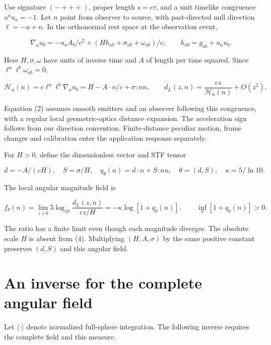 \documentclass[aps,prd,reprint,onecolumn,11pt,nofootinbib,notitlepage]{revtex4-2}
\begin{document}
Use signature \((-+++)\), proper length \(s=c\tau\), and a unit timelike congruence \(u^au_a=-1\). Let \(n\) point from observer to source, with past-directed null direction \(\ell=-u+n\). In the orthonormal rest space at the observation event,

\begin{equation}
 \nabla_a u_b=-u_a A_b/c^2+(Hh_{ab}+\sigma_{ab}+\omega_{ab})/c,
 \qquad h_{ab}=g_{ab}+u_au_b .\tag{1}
\end{equation}

Here \(H,\sigma,\omega\) have units of inverse time and \(A\) of length per time squared. Since \(\ell^a\ell^b\omega_{ab}=0\),

\begin{equation}
 \mathcal H_u(n)=c\ell^a\ell^b\nabla_a u_b
 =H-A\cdot n/c+\sigma:nn,\qquad
 d_L(z,n)=\frac{cz}{\mathcal H_u(n)}+O(z^2).\tag{2}
\end{equation}

Equation (2) assumes smooth emitters and an observer following this congruence, with a regular local geometric-optics distance expansion. The acceleration sign follows from our direction convention. Finite-distance peculiar motion, frame changes and calibration enter the application response separately.

For \(H>0\), define the dimensionless vector and STF tensor

\begin{equation}
 d=-A/(cH),\quad S=\sigma/H,\quad
 q_\theta(n)=d\cdot n+S:nn,\quad \theta=(d,S),\quad
 \kappa=5/\ln10 .\tag{3}
\end{equation}

The local angular magnitude field is

\begin{equation}
 f_\theta(n)=\lim_{z\downarrow0}5\log_{10}
 \frac{d_L(z,n)}{cz/H}=-\kappa\log[1+q_\theta(n)],
 \qquad \inf_n[1+q_\theta(n)]>0 .\tag{4}
\end{equation}

The ratio has a finite limit even though each magnitude diverges. The absolute scale \(H\) is absent from (4). Multiplying \((H,A,\sigma)\) by the same positive constant preserves \((d,S)\) and this angular field.

\section{An inverse for the complete angular field}

Let \(\langle\cdot\rangle\) denote normalized full-sphere integration. The following inverse requires the complete field and this measure.
\end{document}
